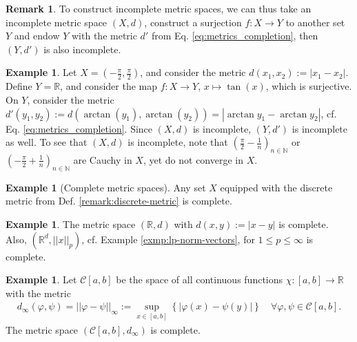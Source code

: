 \documentclass[12pt, a4paper]{article}
\numberwithin{equation}{section}
\theoremstyle{definition}
\theoremstyle{definition}
\newtheorem{exmp}[thm]{Example} %
\newtheorem{remark}[thm]{Remark} %
\newcommand{\norm}[2]{\left\vert\left\vert #1 \right\vert\right\vert_{#2}}
\newcommand{\abs}[1]{\left\vert #1 \right\vert}
\begin{document}
	\begin{remark}
		To construct incomplete metric spaces, we can thus take an incomplete metric space $(X, d)$, construct a surjection $f:X\to Y$ to another set $Y$ and endow $Y$ with the metric $d'$ from Eq. \eqref{eq:metrics_completion}, then $(Y, d')$ is also incomplete.
	\end{remark}
	
	\begin{exmp}\label{exmp:r_with_arctan_metric}
		Let $X = \left(-\frac{\pi}{2}, \frac{\pi}{2}\right)$, and consider the metric $d(x_1, x_2) := \abs{x_1 - x_2}$. Define $Y = \mathbb R$, and consider the map $f: X\to Y$, $x\mapsto \tan(x)$, which is surjective. On $Y$, consider the metric $d'(y_1, y_2) := d\left( \arctan(y_1), \arctan(y_2)\right) = \abs{\arctan y_1 - \arctan y_2}$, cf. Eq. \eqref{eq:metrics_completion}. Since $(X, d)$ is incomplete, $(Y, d')$ is incomplete as well. To see that $(X, d)$ is incomplete, note that $\left(\frac{\pi}{2} - \frac{1}{n}\right)_{n\in\mathbb N}$ or $\left( -\frac{\pi}{2} + \frac{1}{n} \right)_{n\in\mathbb N}$ are Cauchy in $X$, yet do not converge in $X$.
	\end{exmp}
	
	\begin{exmp}[Complete metric spaces]
		Any set $X$ equipped with the discrete metric from Def. \ref{remark:discrete-metric} is complete.
	\end{exmp}
	
	\begin{exmp}
		The metric space $(\mathbb R, d)$ with $d(x, y) := \abs{x - y}$ is \mbox{complete}. Also, $(\mathbb R^{d}, \norm{x}{p})$, cf. Example \ref{exmp:lp-norm-vectors}, for $1\leq p\leq \infty$ is complete.
	\end{exmp}

	\begin{exmp}\label{exmp:space-continuous-functions-complete}
		Let $\mathcal C[a, b]$ be the space of all continuous functions $\chi: [a, b]\to\mathbb{R}$ with the metric 
		\begin{align}
			d_{\infty}(\varphi, \psi) = \norm{\varphi - \psi}{\infty} :=  \sup_{x\in [a, b]}\left\{ \abs{\varphi(x) - \psi(y)} \right\}\quad \forall \varphi, \psi\in\mathcal C[a, b].
		\end{align}
		The metric space $(\mathcal C[a, b], d_{\infty})$ is complete.
	\end{exmp}
\end{document}
